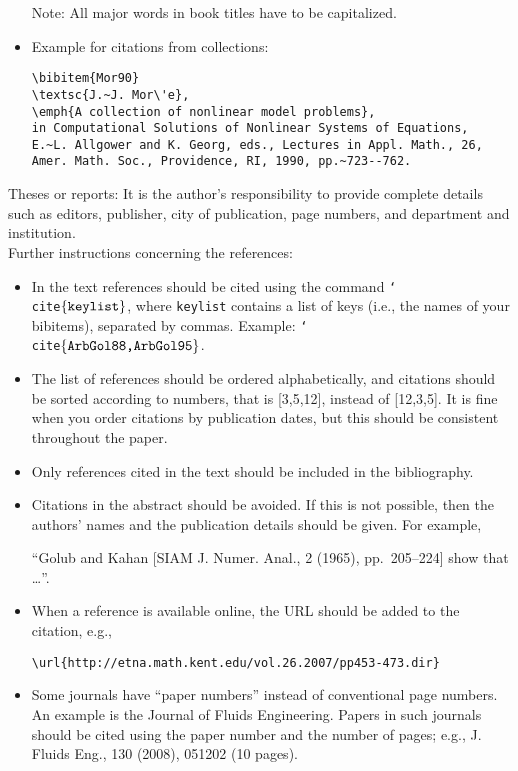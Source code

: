 \documentclass{scrartcl}
\begin{document}
\begin{itemize}
Note: All major words in book titles have to be capitalized.


\item Example for citations from collections:

\begin{verbatim}
\bibitem{Mor90}
\textsc{J.~J. Mor\'e},
\emph{A collection of nonlinear model problems},
in Computational Solutions of Nonlinear Systems of Equations,
E.~L. Allgower and K. Georg, eds., Lectures in Appl. Math., 26,
Amer. Math. Soc., Providence, RI, 1990, pp.~723--762.
\end{verbatim}

\end{itemize}

\noindent Theses or reports: It is the author's responsibility to provide
complete details such as editors, publisher, city of publication, page numbers,
and department and institution.\\

\noindent Further instructions concerning the references:

\begin{itemize}
\item In the text references should be cited using the command
  \texttt{\char`\\cite$\{\mbox{\texttt{keylist}}\}$},
where \texttt{keylist} contains a list of keys (i.e., the names of your bibitems),
separated by commas. Example:
\texttt{\char`\\cite$\{\mbox{\texttt{ArbGol88,ArbGol95}}\}$}.
%
\item The list of references should be ordered alphabetically, and
citations should be sorted according to numbers, that is [3,5,12],
instead of [12,3,5]. It is fine when you order citations by publication
dates, but this should be consistent throughout the paper.
%
\item Only references cited in the text should be included in the bibliography.
%
\item Citations in the abstract should be avoided. If this is not possible,
then the authors' names and the publication details should be given. For example,

``Golub and Kahan [SIAM J. Numer. Anal., 2 (1965), pp.~205--224] show that
\dots''.

\item When a reference is available online, the URL should be added to the
  citation, e.g.,
%
\begin{verbatim}
\url{http://etna.math.kent.edu/vol.26.2007/pp453-473.dir}
\end{verbatim}

\item Some journals have ``paper numbers'' instead of conventional page
  numbers.  An example is the Journal of Fluids Engineering. Papers in such
  journals should be cited using the paper number and the number of pages;
  e.g., J. Fluids Eng., 130 (2008), 051202 (10 pages).


\end{itemize}
\end{document}
